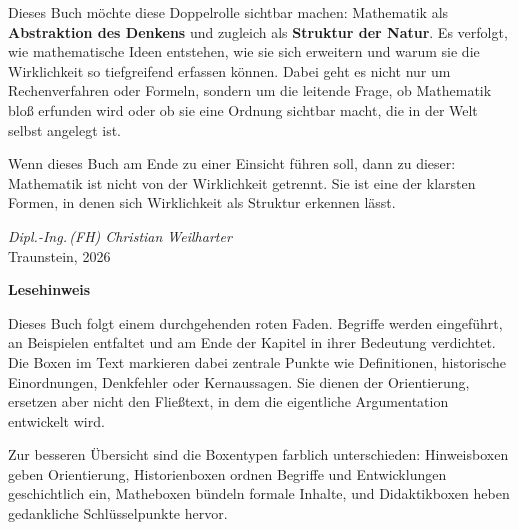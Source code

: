 Dieses Buch möchte diese Doppelrolle sichtbar machen:
Mathematik als \textbf{Abstraktion des Denkens}
und zugleich als \textbf{Struktur der Natur}.
Es verfolgt, wie mathematische Ideen entstehen,
wie sie sich erweitern
und warum sie die Wirklichkeit so tiefgreifend erfassen können.
Dabei geht es nicht nur um Rechenverfahren oder Formeln,
sondern um die leitende Frage,
ob Mathematik bloß erfunden wird
oder ob sie eine Ordnung sichtbar macht,
die in der Welt selbst angelegt ist.

Wenn dieses Buch am Ende zu einer Einsicht führen soll,
dann zu dieser:
Mathematik ist nicht von der Wirklichkeit getrennt.
Sie ist eine der klarsten Formen,
in denen sich Wirklichkeit als Struktur erkennen lässt.

\vspace{2em}

\begin{flushright}
	\textit{Dipl.-Ing.\,(FH) Christian Weilharter}\\
	\vspace{0.5em}
	Traunstein, 2026
\end{flushright}
\newpage
\noindent
\bigskip
\noindent
\textbf{Lesehinweis}

Dieses Buch folgt einem durchgehenden roten Faden.
Begriffe werden eingeführt,
an Beispielen entfaltet
und am Ende der Kapitel in ihrer Bedeutung verdichtet.
Die Boxen im Text markieren dabei zentrale Punkte
wie Definitionen, historische Einordnungen, Denkfehler oder Kernaussagen.
Sie dienen der Orientierung,
ersetzen aber nicht den Fließtext,
in dem die eigentliche Argumentation entwickelt wird.

\medskip
\noindent
Zur besseren Übersicht sind die Boxentypen farblich unterschieden:
Hinweisboxen geben Orientierung,
Historienboxen ordnen Begriffe und Entwicklungen geschichtlich ein,
Matheboxen bündeln formale Inhalte,
und Didaktikboxen heben gedankliche Schlüsselpunkte hervor.